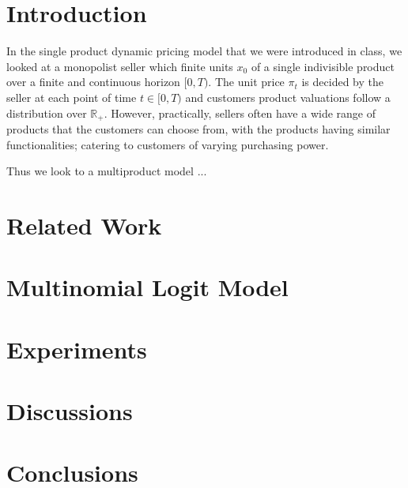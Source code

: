 


\section{Introduction}

In the single product dynamic pricing model that we were introduced in class, we looked at a monopolist seller which finite units $x_0$ of a single indivisible product over a finite and continuous horizon $[0,T)$. The unit price $\pi_t$ is decided by the seller at each point of time $t \in [0,T)$ and customers product valuations follow a distribution over $\mathbb{R}_+$. However, practically, sellers often have a wide range of products that the customers can choose from, with the products having similar functionalities; catering to customers of varying purchasing power.

Thus we look to a multiproduct model \cite{Li2009}...





\section{Related Work}


\section{Multinomial Logit Model}


\section{Experiments}


\section{Discussions}


\section{Conclusions}






